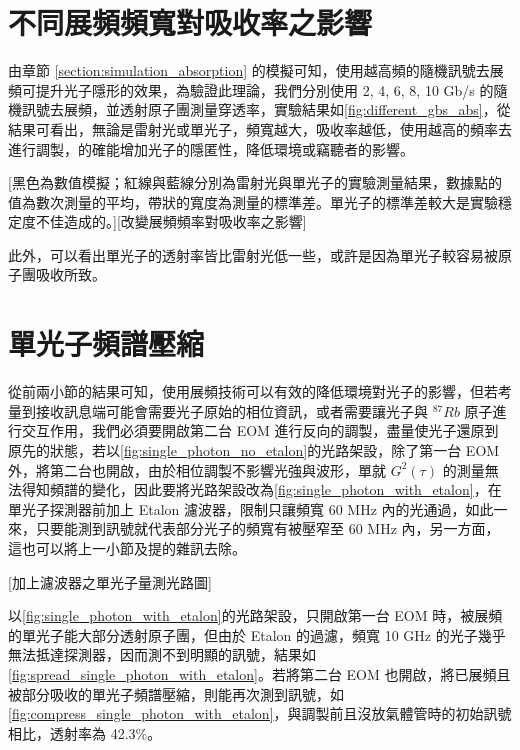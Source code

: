 \documentclass[class=NCU_thesis, crop=false]{standalone}
\begin{document}
\section{不同展頻頻寬對吸收率之影響}
由章節 \ref{section:simulation_absorption} 的模擬可知，使用越高頻的隨機訊號去展頻可提升光子隱形的效果，為驗證此理論，我們分別使用 2, 4, 6, 8, 10 Gb/s 的隨機訊號去展頻，並透射原子團測量穿透率，實驗結果如\cref{fig:different_gbs_abs}，從結果可看出，無論是雷射光或單光子，頻寬越大，吸收率越低，使用越高的頻率去進行調製，的確能增加光子的隱匿性，降低環境或竊聽者的影響。

[黑色為數值模擬；紅線與藍線分別為雷射光與單光子的實驗測量結果，數據點的值為數次測量的平均，帶狀的寬度為測量的標準差。單光子的標準差較大是實驗穩定度不佳造成的。][改變展頻頻率對吸收率之影響]

此外，可以看出單光子的透射率皆比雷射光低一些，或許是因為單光子較容易被原子團吸收所致。

\section{單光子頻譜壓縮}

從前兩小節的結果可知，使用展頻技術可以有效的降低環境對光子的影響，但若考量到接收訊息端可能會需要光子原始的相位資訊，或者需要讓光子與 $^{87}Rb$ 原子進行交互作用，我們必須要開啟第二台 EOM 進行反向的調製，盡量使光子還原到原先的狀態，若以\cref{fig:single_photon_no_etalon}的光路架設，除了第一台 EOM 外，將第二台也開啟，由於相位調製不影響光強與波形，單就 $G^{2}(\tau)$ 的測量無法得知頻譜的變化，因此要將光路架設改為\cref{fig:single_photon_with_etalon}，在單光子探測器前加上 Etalon 濾波器，限制只讓頻寬 60 MHz 內的光通過，如此一來，只要能測到訊號就代表部分光子的頻寬有被壓窄至 60 MHz 內，另一方面，這也可以將上一小節及提的雜訊去除。

[加上濾波器之單光子量測光路圖]

以\cref{fig:single_photon_with_etalon}的光路架設，只開啟第一台 EOM 時，被展頻的單光子能大部分透射原子團，但由於 Etalon 的過濾，頻寬 10 GHz 的光子幾乎無法抵達探測器，因而測不到明顯的訊號，結果如\cref{fig:spread_single_photon_with_etalon}。若將第二台 EOM 也開啟，將已展頻且被部分吸收的單光子頻譜壓縮，則能再次測到訊號，如\cref{fig:compress_single_photon_with_etalon}，與調製前且沒放氣體管時的初始訊號相比，透射率為 42.3\%。
\end{document}
